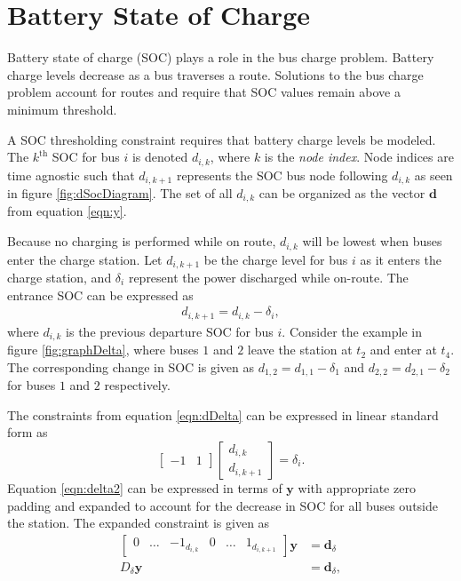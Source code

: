 \section{Battery State of Charge}
Battery state of charge (SOC) plays a role in the bus charge problem. Battery charge levels decrease as a bus traverses a route. Solutions to the bus charge problem account for routes and require that SOC values remain above a minimum threshold. 
\par A SOC thresholding constraint requires that battery charge levels be modeled. The $k^{\text{th}}$ SOC for bus $i$ is denoted $d_{i,k}$, where $k$ is the \textit{node index}. Node indices are time agnostic such that $d_{i,k+1}$ represents the SOC bus node following $d_{i,k}$ as seen in figure \ref{fig:dSocDiagram}. The set of all $d_{i,k}$ can be organized as the vector $\mathbf{d}$ from equation \ref{eqn:y}.
\par Because no charging is performed while on route, $d_{i,k}$ will be lowest when buses enter the charge station. Let $d_{i,k+1}$ be the charge level for bus $i$ as it enters the charge station, and $\delta_i$ represent the power discharged while on-route. The entrance SOC can be expressed as 
\begin{align}\label{eqn:dDelta}
	d_{i,k+1} = d_{i,k} - \delta_i,
\end{align}
where $d_{i,k}$ is the previous departure SOC for bus $i$. Consider the example in figure \ref{fig:graphDelta}, where buses $1$ and $2$ leave the station at $t_2$ and enter at $t_4$. The corresponding change in SOC is given as $d_{1,2} = d_{1,1} - \delta_1$ and $d_{2,2} = d_{2,1} - \delta_2$ for buses $1$ and $2$ respectively.

The constraints from equation \ref{eqn:dDelta} can be expressed in linear standard form as 
\begin{equation}\label{eqn:delta2}
	\begin{bmatrix}
		-1 & 1
	\end{bmatrix}
	\begin{bmatrix}
		d_{i,k} \\ d_{i,k+1}
	\end{bmatrix} = \delta_i.
\end{equation}
Equation \ref{eqn:delta2} can be expressed in terms of $\mathbf{y}$ with appropriate zero padding and expanded to account for the decrease in SOC for all buses outside the station. The expanded constraint is given as 
\begin{equation}\label{eqn:deltaFinal}
	\begin{aligned}
		\begin{bmatrix}0 & \hdots & -1_{d_{i,k}} & 0 & \hdots & 1_{d_{i,k+1}} \end{bmatrix} \mathbf{y} &= \mathbf{d}_\delta \\
			D_\delta\mathbf{y} &= \mathbf{d}_\delta,
	\end{aligned}
\end{equation}
